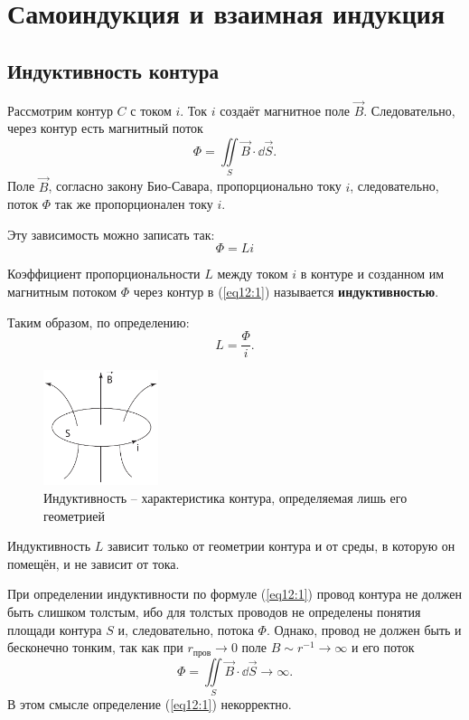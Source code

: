 \chapter{Самоиндукция и взаимная индукция}

\section{Индуктивность контура}

    Рассмотрим контур \( C \) с током \( i \). Ток \( i \) создаёт магнитное
    поле \( \vec{B} \). Следовательно, через контур есть магнитный поток 
    \[ 
        \Phi = \iint\limits_S \vec{B}\cdot\dd \vec{S}.
    \]
    Поле \( \vec{B} \), согласно закону Био-Савара, пропорционально току
    \( i \), следовательно, поток \( \Phi \) так же пропорционален току \( i \).
    
    Эту зависимость можно записать так:
    \begin{equation}
        \Phi = Li
        \label{eq12:1}
    \end{equation}
    
    \begin{definition}
        Коэффициент пропорциональности \( L \) между током \( i \) в контуре и
        созданном им магнитным потоком \( \Phi \) через контур в (\ref{eq12:1})
        называется \textbf{индуктивностью}.
    
        Таким образом, по определению:
        \[
            L = \frac{\Phi}{i}.
        \]
    \end{definition}
    \begin{figure}[!b]
        \center
        \includegraphics[width=0.3\textwidth]{lec12/inductance.pdf}
        \caption{Индуктивность -- характеристика контура, определяемая лишь его
            геометрией}
    \end{figure}    
    Индуктивность \( L \) зависит только от геометрии контура и от среды, в
    которую он помещён, и не зависит от тока.
    
    \begin{remark}
        При определении индуктивности по формуле (\ref{eq12:1}) провод контура
        не должен быть слишком толстым, ибо для толстых проводов не определены
        понятия площади контура \( S \) и, следовательно, потока \( \Phi \).
        Однако, провод не должен быть и бесконечно тонким, так как при
        \( r_{\textit{пров}} \to 0 \) поле \( B \sim r^{-1} \to \infty \) и его
        поток
        \[
            \Phi = \iint\limits_S \vec{B}\cdot\dd \vec{S} \to \infty.
        \]
        В этом смысле определение (\ref{eq12:1}) некорректно.
    \end{remark}
    
